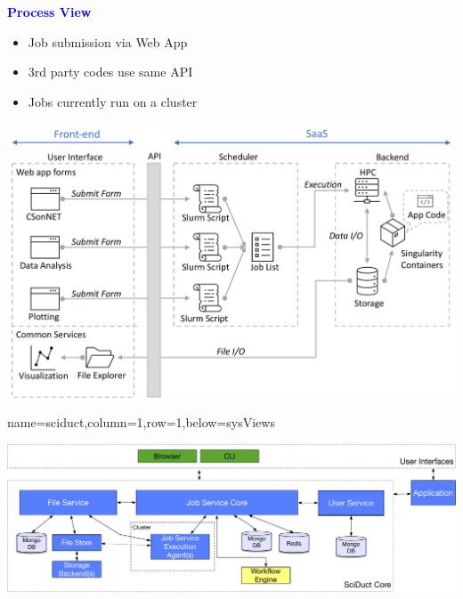 \documentclass[landscape,paperwidth=70in,paperheight=46in,fontscale=0.225]{baposter} %
\begin{document}
\begin{poster}
{\begin{center}
\textcolor{blue}{\large\textbf{Process View}}
\end{center}
\vspace{-5mm}
\begin{minipage}{.24\textwidth}
\begin{itemize}[leftmargin=*,noitemsep,topsep=0pt]
\item Job submission via Web App \smallskip
\item 3rd party codes use same API \smallskip
\item Jobs currently run on a cluster
\end{itemize}
\end{minipage}
\qquad
\begin{minipage}{.73\textwidth}
\vspace{5mm}
\includegraphics[scale=0.20]{figures/netsci_ops_v7.pdf}
\end{minipage}

}

          {name=sciduct,column=1,row=1,below=sysViews}{
          
\includegraphics[scale=0.21]{figures/SciDuctComponents_legacy.pdf}


}
\end{poster}
\end{document}
